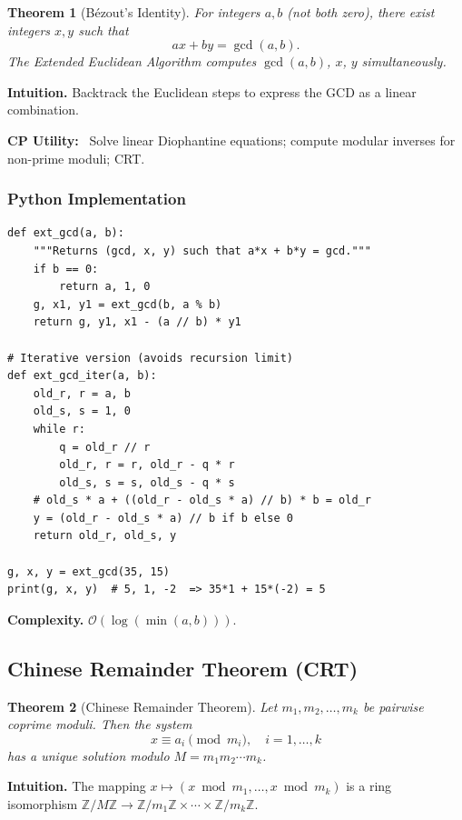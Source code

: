 \documentclass[10pt,a4paper]{article}
\theoremstyle{cpstyle}
\newtheorem{theorem}{Theorem}[section]
\newenvironment{cputility}{%
  \begin{mdframed}[backgroundcolor=theorembg, linecolor=accent!50, linewidth=1pt,
    innerleftmargin=10pt, innerrightmargin=10pt, innertopmargin=6pt, innerbottommargin=6pt]
  \textbf{\color{accent}CP Utility:}~}{%
  \end{mdframed}}
\newcommand{\bigO}[1]{\mathcal{O}\!\left(#1\right)}
\newcommand{\Z}{\mathbb{Z}}
\begin{document}
\begin{theorem}[Bézout's Identity]
For integers $a,b$ (not both zero), there exist integers $x,y$ such that
\[
  ax + by = \gcd(a, b).
\]
The Extended Euclidean Algorithm computes $\gcd(a,b)$, $x$, $y$ simultaneously.
\end{theorem}

\textbf{Intuition.} Backtrack the Euclidean steps to express the GCD as a linear combination.

\begin{cputility}
Solve linear Diophantine equations; compute modular inverses for non-prime moduli; CRT.
\end{cputility}

\subsubsection{Python Implementation}
\begin{lstlisting}[caption={Extended Euclidean Algorithm}]
def ext_gcd(a, b):
    """Returns (gcd, x, y) such that a*x + b*y = gcd."""
    if b == 0:
        return a, 1, 0
    g, x1, y1 = ext_gcd(b, a % b)
    return g, y1, x1 - (a // b) * y1

# Iterative version (avoids recursion limit)
def ext_gcd_iter(a, b):
    old_r, r = a, b
    old_s, s = 1, 0
    while r:
        q = old_r // r
        old_r, r = r, old_r - q * r
        old_s, s = s, old_s - q * s
    # old_s * a + ((old_r - old_s * a) // b) * b = old_r
    y = (old_r - old_s * a) // b if b else 0
    return old_r, old_s, y

g, x, y = ext_gcd(35, 15)
print(g, x, y)  # 5, 1, -2  => 35*1 + 15*(-2) = 5
\end{lstlisting}

\textbf{Complexity.} $\bigO{\log(\min(a,b))}$.

\subsection{Chinese Remainder Theorem (CRT)}

\begin{theorem}[Chinese Remainder Theorem]
Let $m_1, m_2, \ldots, m_k$ be pairwise coprime moduli. Then the system
\[
  x \equiv a_i \pmod{m_i}, \quad i = 1, \ldots, k
\]
has a unique solution modulo $M = m_1 m_2 \cdots m_k$.
\end{theorem}

\textbf{Intuition.} The mapping $x \mapsto (x \bmod m_1, \ldots, x \bmod m_k)$ is a ring isomorphism $\Z/M\Z \to \Z/m_1\Z \times \cdots \times \Z/m_k\Z$.
\end{document}
